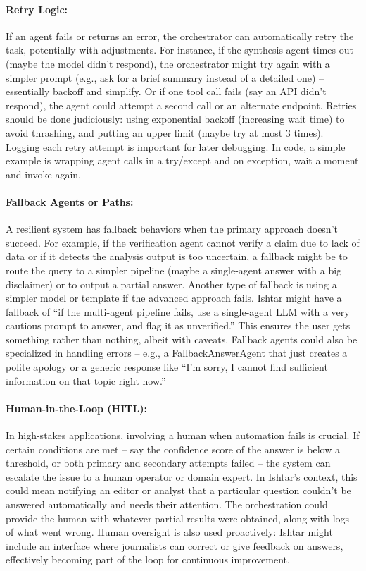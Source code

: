 \paragraph*{Retry Logic:}
If an agent fails or returns an error, the orchestrator can automatically retry the task, potentially with adjustments. For instance, if the synthesis agent times out (maybe the model didn't respond), the orchestrator might try again with a simpler prompt (e.g., ask for a brief summary instead of a detailed one) – essentially backoff and simplify. Or if one tool call fails (say an API didn’t respond), the agent could attempt a second call or an alternate endpoint. Retries should be done judiciously: using exponential backoff (increasing wait time) to avoid thrashing, and putting an upper limit (maybe try at most 3 times). Logging each retry attempt is important for later debugging. In code, a simple example is wrapping agent calls in a try/except and on exception, wait a moment and invoke again.

\paragraph*{Fallback Agents or Paths:}
A resilient system has fallback behaviors when the primary approach doesn’t succeed. For example, if the verification agent cannot verify a claim due to lack of data or if it detects the analysis output is too uncertain, a fallback might be to route the query to a simpler pipeline (maybe a single-agent answer with a big disclaimer) or to output a partial answer. Another type of fallback is using a simpler model or template if the advanced approach fails. Ishtar might have a fallback of “if the multi-agent pipeline fails, use a single-agent LLM with a very cautious prompt to answer, and flag it as unverified.” This ensures the user gets something rather than nothing, albeit with caveats. Fallback agents could also be specialized in handling errors – e.g., a FallbackAnswerAgent that just creates a polite apology or a generic response like “I’m sorry, I cannot find sufficient information on that topic right now.”

\paragraph*{Human-in-the-Loop (HITL):}
In high-stakes applications, involving a human when automation fails is crucial. If certain conditions are met – say the confidence score of the answer is below a threshold, or both primary and secondary attempts failed – the system can escalate the issue to a human operator or domain expert. In Ishtar’s context, this could mean notifying an editor or analyst that a particular question couldn’t be answered automatically and needs their attention. The orchestration could provide the human with whatever partial results were obtained, along with logs of what went wrong. Human oversight is also used proactively: Ishtar might include an interface where journalists can correct or give feedback on answers, effectively becoming part of the loop for continuous improvement.

